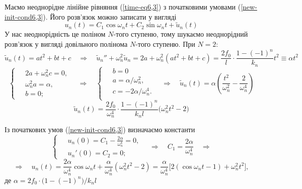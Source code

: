 Маємо неоднорідне лінійне рівняння (\ref{time-eq6,3}) з початковими умовами (\ref{new-init-cond6,3}). Його розв'язок можно записати у вигляді
\begin{equation}
    u_n(t) = C_1 \cos\omega_nt + C_2 \sin\omega_nt + \tilde{u}_n(t)
\end{equation}
У нас неоднорідність це поліном $N$-того ступеню, тому шукаємо неоднорідний розв'язок у вигляді довільного полінома $N$-того ступеню.\newline
При $N=2$:
\begin{equation*}
    \tilde{u}_n(t) = at^2 + bt + c
    \quad\Rightarrow\quad
    \tilde{u}_n'' + \omega_n^2 \tilde{u}_n = 2a + \omega_n^2 (at^2 + bt + c) = \frac{2f_0}{l} \cdot \frac{1 - (-1)^n}{k_n} t^2 \equiv \alpha t^2
\end{equation*}
\begin{equation*}
    \left\{ \begin{aligned}
        \;&2a + \omega_n^2 c = 0,\\
        &\omega_n^2 a = \alpha,\\
        &b = 0;
    \end{aligned} \right.
    \quad\Rightarrow\quad
    \left\{ \begin{aligned}
        \;&b = 0\\
        &a = \alpha/\omega_n^2,\\
        &c = -2\alpha/\omega_n^4.\\
    \end{aligned} \right.
    \quad\Rightarrow\quad
    \tilde{u}_n(t) = \alpha \left(\frac{t^2}{\omega_n^2} - \frac{2}{\omega_n^4}\right)
\end{equation*}
\begin{equation}
    \tilde{u}_n(t) = \frac{2f_0}{\omega_n^4} \cdot \frac{1 - (-1)^n}{k_nl} \big(\omega_n^2t^2 - 2\big)
\end{equation}

Із початкових умов (\ref{new-init-cond6,3}) визначаємо константи
\begin{equation*}
    \left\{ \begin{aligned}
        \;&u_n(0) = C_1 - \frac{2\alpha}{\omega_n^4} = 0,\\
        &u_n'(0) = C_2 = 0;
    \end{aligned} \right.
    \quad\Rightarrow\quad
    C_1 = \frac{2\alpha}{\omega_n^4}
    \quad\Rightarrow
\end{equation*}
\begin{equation}
    \Rightarrow\quad 
    u_n(t) =  \frac{2\alpha}{\omega_n^4} \cos\omega_nt + \frac{\alpha}{\omega_n^4} \left(\omega_n^2t^2 - 2\right) = \frac{\alpha}{\omega_n^4} \bigg[ 2(\cos\omega_nt - 1) +  \omega_n^2t^2\bigg],
\end{equation}
де $\alpha = 2f_0 \cdot \big(1 - (-1)^n\big)/k_nl$

